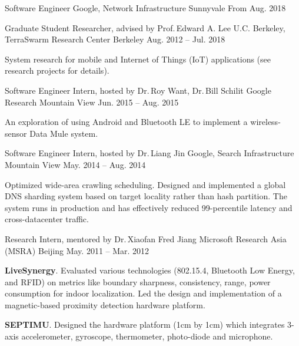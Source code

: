 
\begin{cventries}

  \cventry
  {Software Engineer}
  {Google, Network Infrastructure}
  {Sunnyvale}
  {From Aug. 2018}
  {
  }

  \cventry
  {Graduate Student Researcher, advised by Prof.\,Edward A. Lee}
  {U.C. Berkeley, TerraSwarm Research Center}
  {Berkeley}
  {Aug. 2012 -- Jul. 2018}
  {
    \begin{cvitems}
      System research for mobile and Internet of Things (IoT) applications (see
      research projects for details).
    \end{cvitems}
  }

  \cventry
  {Software Engineer Intern, hosted by Dr.\,Roy Want, Dr.\,Bill Schilit}
  {Google Research}
  {Mountain View}
  {Jun. 2015 -- Aug. 2015}
  {
    \begin{cvitems}
      An exploration of using Android and Bluetooth LE to implement a
      wireless-sensor Data Mule system.
    \end{cvitems}
  }

  \cventry
  {Software Engineer Intern, hosted by Dr.\,Liang Jin}
  {Google, Search Infrastructure}
  {Mountain View}
  {May. 2014 -- Aug. 2014}
  {
    \begin{cvitems}
      Optimized wide-area crawling scheduling. Designed and implemented a global
      DNS sharding system based on target locality rather than hash
      partition. The system runs in production and has effectively reduced
      99-percentile latency and cross-datacenter traffic.
    \end{cvitems}
  }

  \cventry
  {Research Intern, mentored by Dr.\,Xiaofan Fred Jiang}
  {Microsoft Research Asia (MSRA)}
  {Beijing}
  {May. 2011 -- Mar. 2012}
  {
    \begin{cvitems}
      \item \textbf{LiveSynergy}. Evaluated various technologies (802.15.4, Bluetooth
      Low Energy, and RFID) on metrics like boundary sharpness, consistency,
      range, power consumption for indoor localization. Led the design and
      implementation of a magnetic-based proximity detection hardware platform.
      \item \textbf{SEPTIMU}. Designed the hardware platform (1cm by 1cm) which
      integrates 3-axis accelerometer, gyroscope, thermometer, photo-diode and
      microphone.
    \end{cvitems}
  }

\end{cventries}

